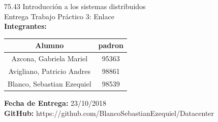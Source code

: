 
%

		
	\begin{titlepage}
		\vspace*{\fill}
		\begin{center}
			\Large 75.43 Introducción a los sistemas distribuidos \\
			\Huge Entrega Trabajo Práctico 3: Enlace \\
			\bigskip\bigskip\bigskip
			\large\textbf{Integrantes:} \\
			\begin{center}
				\begin{tabular}{||c | c||} 
					\hline
					Alumno & padron \\ [0.5ex] 
					\hline\hline
					Azcona, Gabriela Mariel & 95363 \\
					\hline
					Avigliano, Patricio Andres & 98861 \\
					\hline
					Blanco, Sebastian Ezequiel & 98539 \\
					\hline
				\end{tabular}
			\end{center}
			\textbf{Fecha de Entrega:} 23/10/2018\\
			\textbf{GitHub:} https://github.com/BlancoSebastianEzequiel/Datacenter\\

		\end{center}
		\vspace*{\fill}
	\end{titlepage}
	\newpage
			
	\tableofcontents
	\newpage
